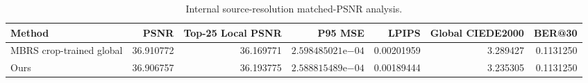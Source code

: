 \begin{table}[t]
  \centering
  \caption{Internal source-resolution matched-PSNR analysis.}
  \label{tab:matched-psnr}
  \small
  \begin{tabular}{lrrrrrr}
    \hline
    Method & PSNR & Top-25 Local PSNR & P95 MSE & LPIPS & Global CIEDE2000 & BER@30 \\
    \hline
    MBRS crop-trained global & 36.910772 & 36.169771 & $2.598485021\mathrm{e}{-04}$ & 0.00201959 & 3.289427 & 0.1131250 \\
    Ours & 36.906757 & 36.193775 & $2.588815489\mathrm{e}{-04}$ & 0.00189444 & 3.235305 & 0.1131250 \\
    \hline
  \end{tabular}
\end{table}
